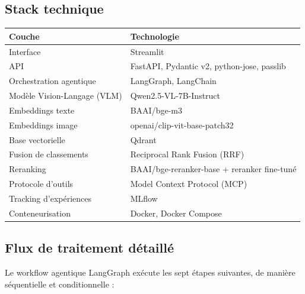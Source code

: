 \documentclass[11pt,a4paper]{article}
\begin{document}
\subsection{Stack technique}
\begin{tabularx}{\textwidth}{l X}
\toprule
Couche & Technologie \\
\midrule
Interface & Streamlit \\
API & FastAPI, Pydantic v2, python-jose, passlib \\
Orchestration agentique & LangGraph, LangChain \\
Modèle Vision-Langage (VLM) & Qwen2.5-VL-7B-Instruct \\
Embeddings texte & BAAI/bge-m3 \\
Embeddings image & openai/clip-vit-base-patch32 \\
Base vectorielle & Qdrant \\
Fusion de classements & Reciprocal Rank Fusion (RRF) \\
Reranking & BAAI/bge-reranker-base + reranker fine-tuné \\
Protocole d'outils & Model Context Protocol (MCP) \\
Tracking d'expériences & MLflow \\
Conteneurisation & Docker, Docker Compose \\
\bottomrule
\end{tabularx}

\subsection{Flux de traitement détaillé}
Le workflow agentique LangGraph exécute les sept étapes suivantes, de manière séquentielle et conditionnelle :
\end{document}
